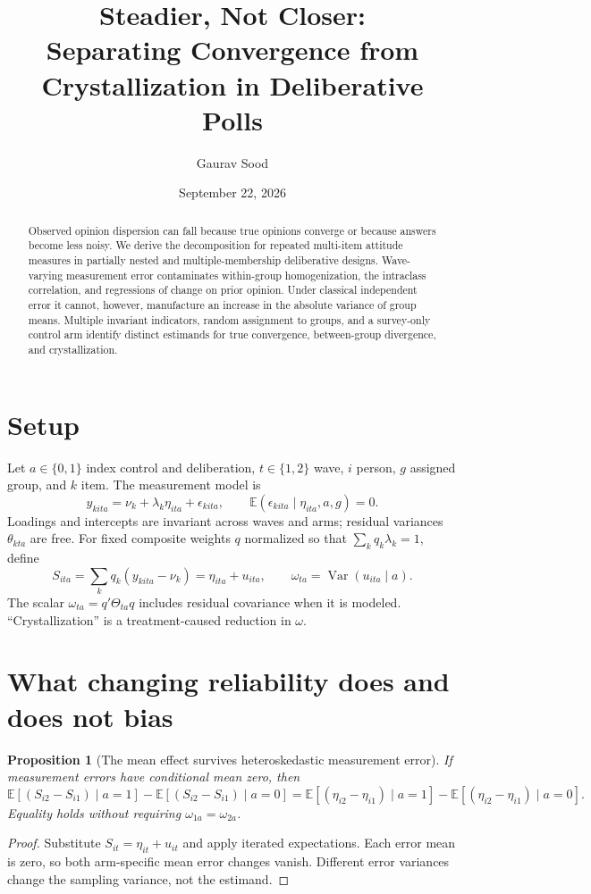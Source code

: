 \documentclass[11pt]{article}
\title{Steadier, Not Closer:\\Separating Convergence from Crystallization in Deliberative Polls}
\author{Gaurav Sood}
\date{September 22, 2026}
\newtheorem{proposition}{Proposition}
\newcommand{\E}{\mathbb{E}}
\newcommand{\Var}{\operatorname{Var}}
\begin{document}
\maketitle

\begin{abstract}
Observed opinion dispersion can fall because true opinions converge or because
answers become less noisy. We derive the decomposition for repeated multi-item
attitude measures in partially nested and multiple-membership deliberative
designs. Wave-varying measurement error contaminates within-group
homogenization, the intraclass correlation, and regressions of change on prior
opinion. Under classical independent error it cannot, however, manufacture an
increase in the absolute variance of group means. Multiple invariant indicators,
random assignment to groups, and a survey-only control arm identify distinct
estimands for true convergence, between-group divergence, and crystallization.
\end{abstract}

\section{Setup}

Let $a\in\{0,1\}$ index control and deliberation, $t\in\{1,2\}$ wave,
$i$ person, $g$ assigned group, and $k$ item. The measurement model is
\begin{equation}
  y_{kita}=\nu_k+\lambda_k\eta_{ita}+\epsilon_{kita},
  \qquad \E(\epsilon_{kita}\mid\eta_{ita},a,g)=0.
\end{equation}
Loadings and intercepts are invariant across waves and arms; residual variances
$\theta_{kta}$ are free. For fixed composite weights $q$ normalized so that
$\sum_k q_k\lambda_k=1$, define
\begin{equation}
  S_{ita}=\sum_k q_k(y_{kita}-\nu_k)=\eta_{ita}+u_{ita},
  \qquad \omega_{ta}=\Var(u_{ita}\mid a).
\end{equation}
The scalar $\omega_{ta}=q'\Theta_{ta}q$ includes residual covariance when it is
modeled. ``Crystallization'' is a treatment-caused reduction in $\omega$.

\section{What changing reliability does and does not bias}

\begin{proposition}[The mean effect survives heteroskedastic measurement error]
If measurement errors have conditional mean zero, then
\[
\E[(S_{i2}-S_{i1})\mid a=1]-\E[(S_{i2}-S_{i1})\mid a=0]
=\E[(\eta_{i2}-\eta_{i1})\mid a=1]-\E[(\eta_{i2}-\eta_{i1})\mid a=0].
\]
Equality holds without requiring $\omega_{1a}=\omega_{2a}$.
\end{proposition}
\begin{proof}
Substitute $S_{it}=\eta_{it}+u_{it}$ and apply iterated expectations. Each error
mean is zero, so both arm-specific mean error changes vanish. Different error
variances change the sampling variance, not the estimand.
\end{proof}
\end{document}
